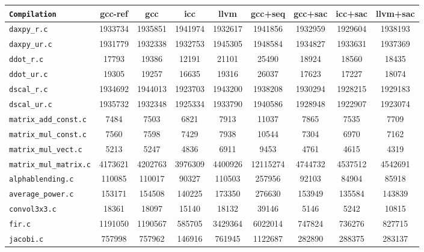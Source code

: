 \begin{tabular}{|l|c|c|c|c|c|c|c|c|}\hline
\texttt{Compilation}&gcc-ref&gcc&icc&llvm&gcc+seq&gcc+sac&icc+sac&llvm+sac\\\hline
\texttt{daxpy\_r.c}&1933734&1935851&1941974&1932617&1941856&1932959&1929604&1938193\\\hline
\texttt{daxpy\_ur.c}&1931779&1932338&1932753&1945305&1948584&1934827&1933631&1937369\\\hline
\texttt{ddot\_r.c}&17793&19386&12191&21101&25490&18924&18560&18435\\\hline
\texttt{ddot\_ur.c}&19305&19257&16635&19316&26037&17623&17227&18074\\\hline
\texttt{dscal\_r.c}&1934692&1944013&1923703&1943200&1938208&1930294&1928215&1929183\\\hline
\texttt{dscal\_ur.c}&1935732&1932348&1925334&1933790&1940586&1928948&1922907&1923074\\\hline
\texttt{matrix\_add\_const.c}&7484&7503&6821&7913&11037&7865&7535&7709\\\hline
\texttt{matrix\_mul\_const.c}&7560&7598&7429&7938&10544&7304&6970&7162\\\hline
\texttt{matrix\_mul\_vect.c}&5213&5247&4836&6911&9453&4761&4615&4319\\\hline
\texttt{matrix\_mul\_matrix.c}&4173621&4202763&3976309&4400926&12115274&4744732&4537512&4542691\\\hline
\texttt{alphablending.c}&110085&110017&90327&110503&257956&92103&84904&85918\\\hline
\texttt{average\_power.c}&153171&154508&140225&173350&276630&153949&135584&143839\\\hline
\texttt{convol3x3.c}&18361&18097&15140&18132&39146&5146&5242&10815\\\hline
\texttt{fir.c}&1191050&1190567&585705&3429364&6022014&747824&736276&827715\\\hline
\texttt{jacobi.c}&757998&757962&146916&761945&1122687&282890&288375&283137\\\hline
\hline\end{tabular}
